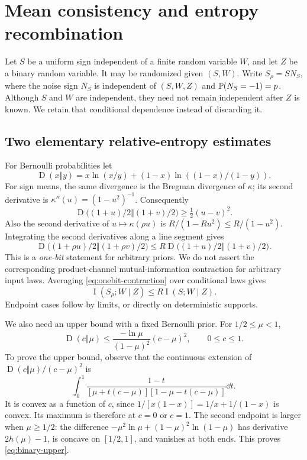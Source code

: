 \documentclass[11pt]{article}
\theoremstyle{remark}\newtheorem{remark}[theorem]{Remark}
\newcommand{\KL}{\operatorname{D}}\newcommand{\MI}{\operatorname I}
\numberwithin{equation}{section}
\begin{document}
\section{Mean consistency and entropy recombination}\label{sec:privacy}
Let $S$ be a uniform sign independent of a finite random variable $W$, and let $Z$ be a binary random variable. It may be randomized given $(S,W)$. Write $S_\rho=SN_S$, where the noise sign $N_S$ is independent of $(S,W,Z)$ and
$\mathbb P(N_S=-1)=p$.
Although $S$ and $W$ are independent, they need not remain independent after $Z$ is known. We retain that conditional dependence instead of discarding it.

\subsection{Two elementary relative-entropy estimates}
For Bernoulli probabilities let
\[
\KL(x\Vert y)=x\ln(x/y)+(1-x)\ln((1-x)/(1-y)).
\]
For sign means, the same divergence is the Bregman divergence of $\kappa$; its second derivative is $\kappa''(u)=(1-u^2)^{-1}$. Consequently
\begin{equation}\label{eq:binary-pinsker}
\KL\bigl((1+u)/2\Vert(1+v)/2\bigr)\ge\tfrac12(u-v)^2.
\end{equation}
Also the second derivative of $u\mapsto\kappa(\rho u)$ is
$R/(1-Ru^2)\le R/(1-u^2)$. Integrating the second derivatives along a line segment gives
\begin{equation}\label{eq:onebit-contraction}
\KL\bigl((1+\rho u)/2\Vert(1+\rho v)/2\bigr)
\le R\KL\bigl((1+u)/2\Vert(1+v)/2\bigr).
\end{equation}
This is a \emph{one-bit} statement for arbitrary priors. We do not assert the corresponding product-channel mutual-information contraction for arbitrary input laws. Averaging \eqref{eq:onebit-contraction} over conditional laws gives
\begin{equation}\label{eq:conditional-contraction}
\MI(S_\rho;W\mid Z)\le R\MI(S;W\mid Z).
\end{equation}
Endpoint cases follow by limits, or directly on deterministic supports.

We also need an upper bound with a fixed Bernoulli prior. For $1/2\le\mu<1$,
\begin{equation}\label{eq:binary-upper}
\KL(c\Vert\mu)\le\frac{-\ln\mu}{(1-\mu)^2}(c-\mu)^2,
\qquad 0\le c\le1.
\end{equation}
To prove the upper bound, observe that the continuous extension of
$\KL(c\Vert\mu)/(c-\mu)^2$ is
\[
\int_0^1\frac{1-t}{[\mu+t(c-\mu)][1-\mu-t(c-\mu)]}\dd t.
\]
It is convex as a function of $c$, since $1/[x(1-x)]=1/x+1/(1-x)$ is convex. Its maximum is therefore at $c=0$ or $c=1$. The second endpoint is larger when $\mu\ge1/2$: the difference
$-\mu^2\ln\mu+(1-\mu)^2\ln(1-\mu)$ has derivative $2h(\mu)-1$, is concave on $[1/2,1]$, and vanishes at both ends. This proves \eqref{eq:binary-upper}.
\end{document}
